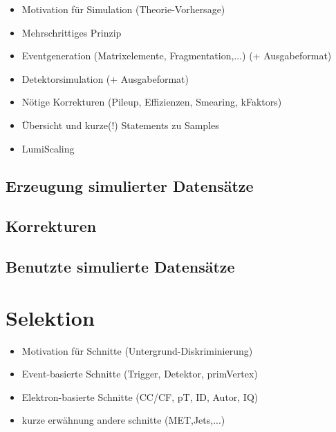 \begin{itemize}
    \item Motivation für Simulation (Theorie-Vorhersage)
    \item Mehrschrittiges Prinzip
    \item Eventgeneration (Matrixelemente, Fragmentation,...) (+ Ausgabeformat)
    \item Detektorsimulation (+ Ausgabeformat)
    \item Nötige Korrekturen (Pileup, Effizienzen, Smearing, kFaktors)
    \item Übersicht und kurze(!) Statements zu Samples
    \item LumiScaling
\end{itemize}

\subsection{Erzeugung simulierter Datensätze}
\subsection{Korrekturen}
\subsection{Benutzte simulierte Datensätze}



\section{Selektion}
\label{data_sim_selection:selection}

\begin{itemize}
    \item Motivation für Schnitte (Untergrund-Diskriminierung)
    \item Event-basierte Schnitte (Trigger, Detektor, primVertex)
    \item Elektron-basierte Schnitte (CC/CF, pT, ID, Autor, IQ)
    \item kurze erwähnung andere schnitte (MET,Jets,...)
\end{itemize}


